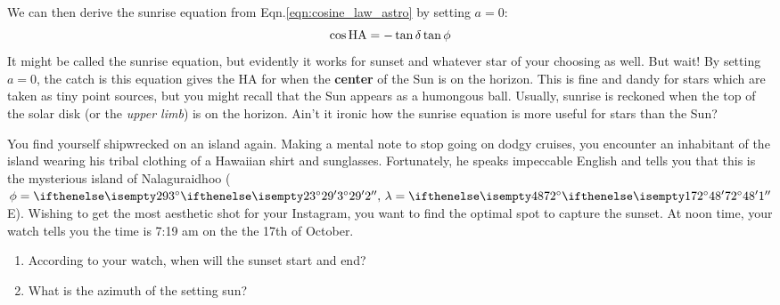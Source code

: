 \documentclass{article}
\begin{document}
We can then derive the sunrise equation from Eqn.\;\ref{eqn:cosine_law_astro} by setting $a=0$:
\begin{equation}
    \cos \mathrm{HA} = -\tan \delta \tan \phi
\end{equation}
It might be called the sunrise equation, but evidently it works for sunset and whatever star of your choosing as well. But wait! By setting $a=0$, the catch is this equation gives the HA for when the \textbf{center} of the Sun is on the horizon. This is fine and dandy for stars which are taken as tiny point sources, but you might recall that the Sun appears as a humongous ball. Usually, sunrise is reckoned when the top of the solar disk (or the \textit{upper limb}) is on the horizon. Ain't it ironic how the sunrise equation is more useful for stars than the Sun?

\begin{Exercise}
You find yourself shipwrecked on an island again. Making a mental note to stop going on dodgy cruises, you encounter an inhabitant of the island wearing his tribal clothing of a Hawaiian shirt and sunglasses. Fortunately, he speaks impeccable English and tells you that this is the mysterious island of Nalaguraidhoo ($\phi=\sexg{3}{29}{2},\,\lambda=\sexg{72}{48}{1}$E). Wishing to get the most aesthetic shot for your Instagram, you want to find the optimal spot to capture the sunset. At noon time, your watch tells you the time is 7:19 am on the the 17th of October.
\begin{enumerate}[label=(\roman*)]
    \item According to your watch, when will the sunset start and end?
    \item What is the azimuth of the setting sun?
\end{enumerate}
\end{Exercise}
\medskip
\end{document}

